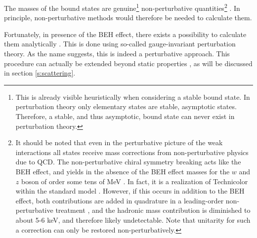 \documentclass[final,12pt]{article}
\newcommand*{\1}{1\!\!\!\bot}
\begin{document}
The masses of the bound states are genuine\footnote{This is already visible heuristically when considering a stable bound state. In perturbation theory only elementary states are stable, asymptotic states. Therefore, a stable, and thus asymptotic, bound state can never exist in perturbation theory.} non-perturbative quantities\footnote{It should be noted that even in the perturbative picture of the weak interactions all states receive mass corrections from non-perturbative physics due to QCD. The non-perturbative chiral symmetry breaking acts like the BEH effect, and yields in the absence of the BEH effect masses for the $w$ and $z$ boson of order some tens of MeV \cite{Quigg:2009xr}. In fact, it is a realization of Technicolor \cite{Hill:2002ap,Morrissey:2009tf,Andersen:2011yj} within the standard model \cite{Quigg:2009xr}. However, if this occurs in addition to the BEH effect, both contributions are added in quadrature in a leading-order non-perturbative treatment \cite{Eichmann:pc}, and the hadronic mass contribution is diminished to about 5-6 keV, and therefore likely undetectable. Note that unitarity for such a correction can only be restored non-perturbatively.} \cite{Alkofer:2000wg,Hoyer:2014gna}. In principle, non-perturbative methods would therefore be needed to calculate them.

Fortunately, in presence of the BEH effect, there exists a possibility to calculate them analytically \cite{Frohlich:1980gj,Frohlich:1981yi}. This is done using so-called \cite{Seiler:2015rwa} gauge-invariant perturbation theory. As the name suggests, this is indeed a perturbative approach. This procedure can actually be extended beyond static properties \cite{Frohlich:1980gj,Frohlich:1981yi,Maas:2012ct,Egger:2017tkd}, as will be discussed in section \ref{s:scattering}.
\end{document}
